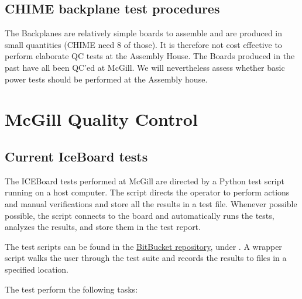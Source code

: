 \documentclass[11pt,article]{memoir}
\begin{document}
\subsection{CHIME backplane test procedures}

The Backplanes are relatively simple boards to assemble and are produced in
small quantities (CHIME need 8 of those). It is therefore not cost effective
to perform elaborate QC tests at the Assembly House. The Boards produced in
the past have all been QC'ed at McGill. We will nevertheless assess whether
basic power tests should be performed at the Assembly house.


\section{McGill Quality Control}

\subsection{Current IceBoard tests}

The ICEBoard tests performed at McGill are directed by a Python test script
running on a host computer. The script directs the operator to perform actions
and manual verifications and store all the results in a test file. Whenever
possible possible, the script connects to the board and automatically runs the
tests, analyzes the results, and store them in the test report.

The test scripts can be found in the \href{https://bitbucket.org/chime/ch_acq}{ BitBucket repository}, under
. A wrapper script walks the user through the test suite and records the results to files in a specified location.

The test perform the following tasks:
\end{document}
